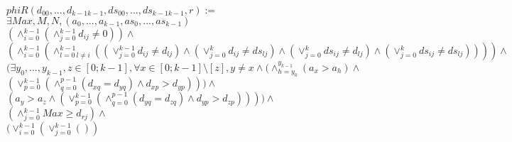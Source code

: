 \documentclass{article}
\begin{document}
\begin{center}
$phiR(d_{00}, ...,d_{k-1k-1},ds_{00}, ...,ds_{k-1k-1}, r):=$\\
$\exists Max, M, N, (a_{0}, ..., a_{k-1}, as_{0}, ..., as_{k-1})$\\
$(\land_{i=0}^{k-1}(\land_{j=0}^{k-1}d_{ij}\not=0))\land $\\%
$( \land_{i=0}^{k-1}(
\land_{l=0\ l\not=i}^{k-1}(
(\lor_{j=0}^{k-1}d_{ij} \not= d_{lj})
\land (\lor_{j=0}^{k}d_{ij} \not= ds_{lj})
\land (\lor_{j=0}^{k}ds_{ij} \not= d_{lj})
\land (\lor_{j=0}^{k}ds_{ij} \not= ds_{lj})
) ))\land$\\%
$(\exists y_{0}, ..., y_{k-1},z \in [0;k-1], \forall x \in [0;k-1] \setminus [z], y\not=x \land
(\land_{h=y_{0}}^{y_{k-1}}(a_{x} > a_{h}) \land $\\
$(\lor_{p=0}^{k-1}(\land_{q=0}^{p-1}(d_{xq} = d_{yq}) \land d_{xp} > d_{yp} ) ) )\land $\\
$(a_{y} > a_{z} \land (\lor_{p=0}^{k-1}(\land_{q=0}^{p-1}(d_{yq} = d_{zq}) \land d_{yp} > d_{zp} ) ))
)\land$\\
$(\land_{j=0}^{k-1} Max \geq d_{rj})\land$\\
$(\lor_{i=0}^{k-1}(\lor_{j=0}^{k-1}())$
\end{center}
\end{document}
